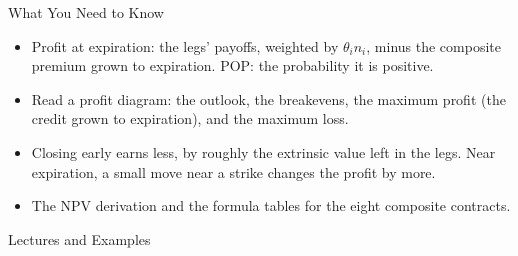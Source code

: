 \documentclass[aspectratio=169,11pt]{beamer}
\newcommand{\repo}{https://github.com/varnerlab/CHEME-5660-CourseRepository-Fall-2026/blob/main/lectures/week-11/L11a}
\begin{document}
\begin{frame}{What You Need to Know}
  \vspace{0.3em}
  {\large\textbf{}}
  \begin{itemize}\setlength{\itemsep}{0.4em}
    \item Profit at expiration: the legs' payoffs, weighted by $\theta_{i}n_{i}$,
      minus the composite premium grown to expiration. POP: the probability it is
      positive.
    \item Read a profit diagram: the outlook, the breakevens, the maximum profit
      (the credit grown to expiration), and the maximum loss.
    \item Closing early earns less, by roughly the extrinsic value left in the
      legs. Near expiration, a small move near a strike changes the profit by more.
  \end{itemize}

  \vspace{0.5em}
  {\large\textbf{} }
  \begin{itemize}\setlength{\itemsep}{0.3em}
    \item The NPV derivation and the formula tables for the eight composite
      contracts.
  \end{itemize}
\end{frame}

\begin{frame}{Lectures and Examples}
  \vspace{0.3em}
  {\normalsize\textbf{}\par\small
  \href{\repo/CHEME-5660-L11a-Lecture-CompositeContracts-Fall-2026.ipynb}{}}

  \vspace{0.6em}
  {\normalsize\textbf{}\par\small
  \href{\repo/CHEME-5660-L11a-Example-Delta-VerticalSpread-Fall-2026.ipynb}{}}

  \vspace{0.45em}
  {\normalsize\textbf{}\par\small
  \href{\repo/CHEME-5660-L11a-Example-Straddle-AMD-Earnings-Fall-2026.ipynb}{}\par
  \href{\repo/CHEME-5660-L11a-Derivation-ProfitLossBreakeven-Fall-2026.ipynb}{}}
\end{frame}
\end{document}
